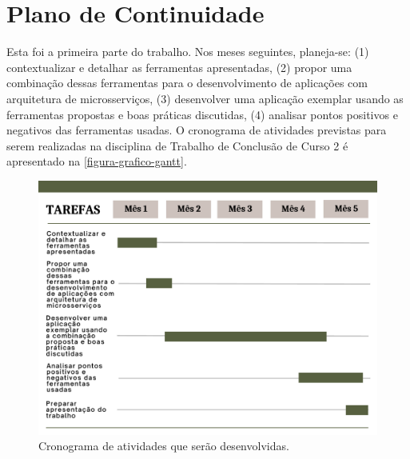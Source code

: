 \chapter*{Plano de Continuidade}

Esta foi a primeira parte do trabalho. Nos meses seguintes, planeja-se: (1) contextualizar e detalhar as ferramentas apresentadas, (2) propor uma combinação dessas ferramentas para o desenvolvimento de aplicações com arquitetura de microsserviços, (3) desenvolver uma aplicação exemplar usando as ferramentas propostas e boas práticas discutidas, (4) analisar pontos positivos e negativos das ferramentas usadas. O cronograma de atividades previstas para serem realizadas na disciplina de Trabalho de Conclusão de Curso 2 é apresentado na \autoref{figura-grafico-gantt}.

\begin{figure}[htb]
	\caption{\label{figura-grafico-gantt}Cronograma de atividades que serão desenvolvidas.}
	\begin{center}
	    \includegraphics[scale=0.5]{Imagens/grafico-gantt.pdf}
	\end{center}
\end{figure}